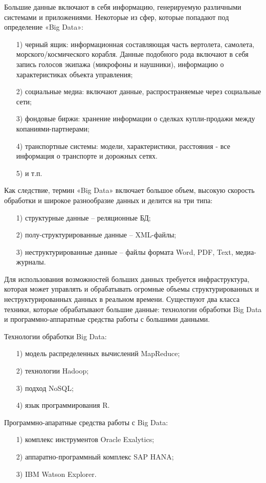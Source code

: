 \documentclass[12pt]{report}
\begin{document}
	Большие данные включают в себя информацию, генерируемую различными системами и приложениями. Некоторые из сфер, которые попадают под определение «Big Data»:
	\begin{enumerate}
		\item[1)] черный ящик: информационная составляющая часть вертолета, самолета, морского/космического корабля. Данные подобного рода включают в себя запись голосов экипажа (микрофоны и наушники), информацию о характеристиках объекта управления;
		\item[2)] социальные медиа: включают данные, распространяемые через социальные сети;
		\item[3)] фондовые биржи: хранение информации о сделках купли-продажи между копаниями-партнерами;
		\item[4)] транспортные системы: модели, характеристики, расстояния  - все информация о транспорте и дорожных сетях.
		\item[5)] и т.п.
	\end{enumerate}
	
	Как следствие, термин «Big Data» включает большое объем, высокую скорость обработки и широкое разнообразие данных и делится на три типа:
	\begin{enumerate}
		\item[1)] структурные данные – реляционные БД;
		\item[2)] полу-структурированные данные – XML-файлы;
		\item[3)] неструктурированные данные – файлы формата Word, PDF, Text, медиа-журналы.
	\end{enumerate}

	Для использования возможностей больших данных требуется инфраструктура, которая может управлять и обрабатывать огромные объемы структурированных и неструктурированных данных в реальном времени. Существуют два класса техники, которые обрабатывают большие данные: технологии обработки Big Data и программно-аппаратные средства работы с большими данными.

	Технологии обработки Big Data:
	\begin{enumerate}
		\item[1)] модель распределенных вычислений MapReduce;
		\item[2)] технологии Hadoop;
		\item[3)] подход NoSQL;
		\item[4)] язык программирования R.
	\end{enumerate}
	
	Программно-апаратные средства работы с Big Data:
	\begin{enumerate}
		\item[1)] комплекс инструментов Oracle Exalytics;
		\item[2)] аппаратно-программный комплекс SAP HANA;
		\item[3)] IBM Watson Explorer.
	\end{enumerate}
	
\end{document}

